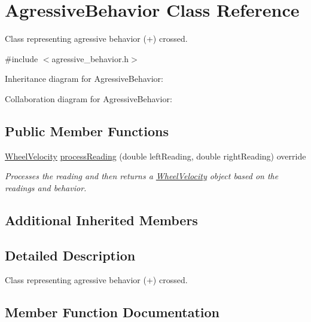 \hypertarget{classAgressiveBehavior}{}\section{Agressive\+Behavior Class Reference}
\label{classAgressiveBehavior}


Class representing agressive behavior (+) crossed.  




{\ttfamily \#include $<$agressive\+\_\+behavior.\+h$>$}



Inheritance diagram for Agressive\+Behavior\+:


Collaboration diagram for Agressive\+Behavior\+:
\subsection*{Public Member Functions}
\begin{DoxyCompactItemize}
\item 
\hyperlink{structWheelVelocity}{Wheel\+Velocity} \hyperlink{classAgressiveBehavior_a9b854875a7067e4102d488b4c3cb89dd}{process\+Reading} (double left\+Reading, double right\+Reading) override
\begin{DoxyCompactList}\small\item\em Processes the reading and then returns a \hyperlink{structWheelVelocity}{Wheel\+Velocity} object based on the readings and behavior. \end{DoxyCompactList}\end{DoxyCompactItemize}
\subsection*{Additional Inherited Members}


\subsection{Detailed Description}
Class representing agressive behavior (+) crossed. 

\subsection{Member Function Documentation}
